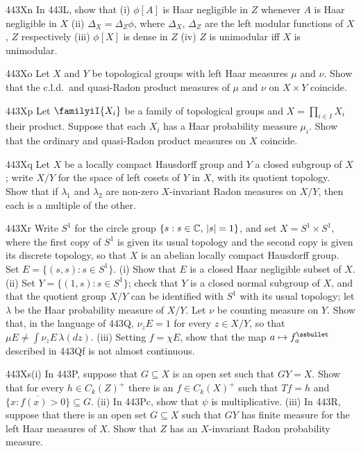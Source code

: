 {\spheader 443Xn In 443L, show that (i) $\phi[A]$ is Haar negligible in $Z$
whenever $A$ is Haar negligible in $X$ (ii) $\Delta_X=\Delta_Z\phi$, where
$\Delta_X$, $\Delta_Z$ are the left modular functions of $X$, $Z$
respectively (iii) $\phi[X]$ is dense in $Z$ (iv) $Z$ is unimodular iff $X$
is unimodular.

\sqheader 443Xo Let $X$ and $Y$ be topological groups with left Haar
measures $\mu$ and $\nu$.   Show that the c.l.d.\ and quasi-Radon
product measures of $\mu$ and $\nu$ on $X\times Y$ coincide.

\spheader 443Xp Let $\familyiI{X_i}$ be a family of topological groups
and $X=\prod_{i\in I}X_i$ their product.   Suppose that each $X_i$ has a
Haar probability measure $\mu_i$.   Show that the ordinary and
quasi-Radon product measures on $X$ coincide.

\spheader 443Xq Let $X$ be a locally compact Hausdorff group and $Y$ a
closed subgroup of $X$;  write $X/Y$ for the space of left cosets of $Y$
in $X$, with its quotient topology.   Show that if $\lambda_1$ and
$\lambda_2$ are non-zero $X$-invariant Radon measures on $X/Y$, then
each is a multiple of the other.   

\sqheader 443Xr Write $S^1$ for the circle group
$\{s:s\in\Bbb C,\,|s|=1\}$, and set $X=S^1\times S^1$, where the first copy of $S^1$
is given its usual topology and the second copy is given its discrete
topology, so that $X$ is an abelian locally compact Hausdorff group.
Set $E=\{(s,s):s\in S^1\}$.
(i) Show that $E$ is a closed Haar negligible subset of $X$.
(ii) Set $Y=\{(1,s):s\in S^1\}$;  check that $Y$ is a closed
normal subgroup of $X$, and that the quotient group $X/Y$ can be
identified with $S^1$ with its usual topology;  let $\lambda$ be the
Haar probability measure of $X/Y$.   Let $\nu$ be counting measure on
$Y$.   Show that, in the language of 443Q, $\nu_zE=1$ for every
$z\in X/Y$, so that $\mu E\ne\int\nu_zE\,\lambda(dz)$.
(iii) Setting $f=\chi E$,
show that the map $a\mapsto f_a^{\ssbullet}$ described in 443Qf is not
almost continuous.

\spheader 443Xs(i) In 443P, suppose that $G\subseteq X$ is an open set
such that $GY=X$.   Show that for every $h\in C_k(Z)^+$ there is an
$f\in C_k(X)^+$ such that $Tf=h$
and $\overline{\{x:f(x)>0\}}\subseteq G$.
(ii) In 443Pc, show that $\psi$ is multiplicative.
(iii) In 443R, suppose that
there is an open set $G\subseteq X$
such that $GY$ has finite measure for the left Haar measures
of $X$.   Show that $Z$ has an $X$-invariant Radon probability measure.

}
